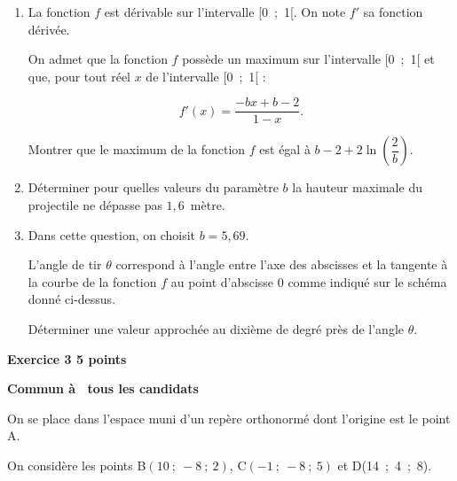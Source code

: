 \documentclass[10pt]{article}
\begin{document}
\medskip

\begin{enumerate}
\item La fonction $f$ est dérivable sur l'intervalle [0~;~1[. On note $f'$ sa fonction dérivée.

On admet que la fonction $f$ possède un maximum sur l'intervalle [0~;~1[ et que, pour tout réel
$x$ de l'intervalle [0~;~1[ :

\[f'(x) = \dfrac{- bx + b - 2}{1 - x}.\]

Montrer que le maximum de la fonction $f$ est égal à $b - 2 + 2\ln \left(\dfrac{2}{b}\right)$.
\item  Déterminer pour quelles valeurs du paramètre $b$ la hauteur maximale du projectile ne dépasse
pas $1,6$~mètre.
\item  Dans cette question, on choisit $b = 5,69$.

L'angle de tir $\theta$ correspond à l'angle entre l'axe des abscisses et la tangente à la courbe de la
fonction $f$ au point d'abscisse $0$ comme indiqué sur le schéma donné ci-dessus.

Déterminer une valeur approchée au dixième de degré près de l'angle $\theta$.
\end{enumerate}
 
\vspace{0,5cm}

\textbf{Exercice 3 \hfill  5 points}

\textbf{Commun à  tous les candidats}

\medskip

On se place dans l'espace muni d'un repère orthonormé dont l'origine est le point A.

On considère les points B$(10~;~-8~;~2)$, C$(-1~;~-8~;~5)$ et D(14~;~4~;~8).

\medskip
\end{document}
